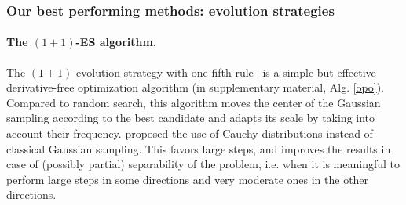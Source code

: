 

\subsubsection{Our best performing methods: evolution strategies}\label{es}
\paragraph{The $(1+1)$-ES algorithm.}
The $(1+1)$-evolution strategy with one-fifth rule~\citep{opo1,opo2} is a simple but effective derivative-free optimization algorithm (in supplementary material, Alg. \ref{opo}). Compared to random search, this algorithm moves the center of the Gaussian sampling according to the best candidate and adapts its scale by taking into account their frequency. \cite{cauchy} proposed the use of Cauchy distributions instead of classical Gaussian sampling. This favors large steps, and improves the results in case of (possibly partial) separability of the problem, i.e. when it is meaningful to perform large steps in some directions and very moderate ones in the other directions. 




